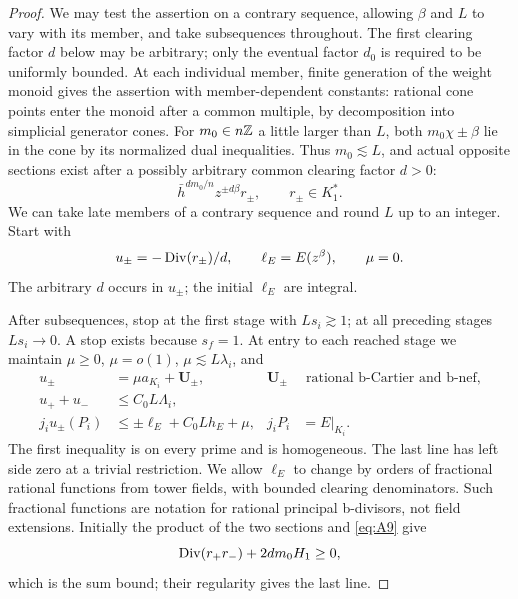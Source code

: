 \begin{proof}
We may test the assertion on a contrary sequence, allowing $\beta$ and
$L$ to vary with its member, and take subsequences throughout.
The first clearing factor $d$ below may be arbitrary; only the eventual
factor $d_0$ is required to be uniformly bounded.
At each individual member, finite
generation of the weight monoid gives the assertion with
member-dependent constants: rational cone points enter the monoid
after a common multiple, by decomposition into simplicial
generator cones. For \(m_0\in n\mathbb Z\) a little larger than \(L\),
both \(m_0\chi\pm\beta\) lie in the cone by its normalized dual
inequalities. Thus \(m_0\lesssim L\), and actual opposite sections
exist after a possibly arbitrary common clearing factor \(d>0\):
\[
                 \bar h^{dm_0/n}z^{\pm d\beta}r_\pm,
                     \qquad r_\pm\in K_1^* .
\]
We can take late members of a contrary sequence and round \(L\)
up to an integer. Start with
\[
         u_\pm=-\operatorname{Div}(r_\pm)/d,\qquad
         \ell_E=E(z^\beta),\qquad \mu=0.
\]
The arbitrary \(d\) occurs in \(u_\pm\); the initial
\(\ell_E\) are integral.

After subsequences, stop at the first stage with \(Ls_i\gtrsim1\);
at all preceding stages \(Ls_i\to0\). A stop exists because
\(s_f=1\). At entry to each reached stage we maintain
\(\mu\ge0\), \(\mu=o(1)\), \(\mu\lesssim L\lambda_i\), and
\begin{equation}\label{eq:C6}
\begin{aligned}
 u_\pm&=\mu a_{K_i}+\mathbf U_\pm,
 &\mathbf U_\pm&\text{ rational b-Cartier and b-nef},\\
 u_++u_-&\le C_0L\Lambda_i,\\
 j_iu_\pm(P_i)&\le\pm\ell_E+C_0Lh_E+\mu,
 &j_iP_i&=E|_{K_i}.
\end{aligned}
\end{equation}
The first inequality is on every prime and is homogeneous.
The last line has left side zero at a trivial restriction.
We allow \(\ell_E\) to change by orders of fractional rational
functions from tower fields, with bounded clearing denominators.
Such fractional functions are notation for rational principal
b-divisors, not field extensions.
Initially the product of the two sections and \eqref{eq:A9} give
\[
                  \operatorname{Div}(r_+r_-)+2dm_0H_1\ge0,
\]
which is the sum bound; their regularity gives the last line.


\end{proof}
